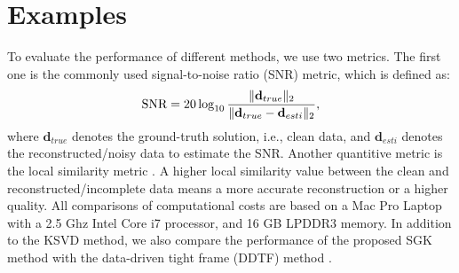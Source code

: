 \section{Examples}
To evaluate the performance of different methods, we use two metrics. The first one is the commonly used signal-to-noise ratio (SNR) metric, which is defined as:
\begin{equation}
\label{eq:snr}
\text{SNR}=20\log_{10}\frac{\Arrowvert \mathbf{d}_{true} \Arrowvert_2}{\Arrowvert \mathbf{d}_{true} -\mathbf{d}_{esti}\Arrowvert_2},
\end{equation}
where $\mathbf{d}_{true}$ denotes the ground-truth solution, i.e., clean data, and $\mathbf{d}_{esti}$ denotes the reconstructed/noisy data to estimate the SNR. Another quantitive metric is the local similarity metric \cite{fomel2007localattr,yangkang2015ortho}. A higher local similarity value between the clean and reconstructed/incomplete data means a more accurate reconstruction or a higher quality. All comparisons of computational costs are based on a Mac Pro Laptop with a 2.5 Ghz Intel Core i7 processor, and 16 GB LPDDR3 memory. In addition to the KSVD method, we also compare the performance of the proposed SGK method with the data-driven tight frame (DDTF) method \cite{siwei2016}.


